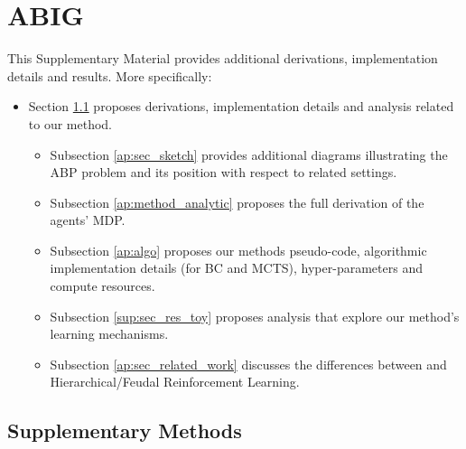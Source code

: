 
\chapter{ABIG}
This Supplementary Material provides additional derivations, implementation details and results. More specifically: 
\begin{itemize}[noitemsep]

    \item Section \ref{ap:method} proposes derivations, implementation details and analysis related to our method.
    \begin{itemize}[noitemsep]
        \item Subsection \ref{ap:sec_sketch} provides additional diagrams illustrating the ABP problem and its position with respect to related settings.
        \item Subsection \ref{ap:method_analytic} proposes the full derivation of the agents' MDP.
        \item Subsection \ref{ap:algo} proposes our methods pseudo-code, algorithmic implementation details (for BC and MCTS), hyper-parameters and compute resources.
        \item Subsection \ref{sup:sec_res_toy} proposes analysis that explore our method's learning mechanisms.
        \item Subsection \ref{ap:sec_related_work} discusses the differences between \abp and Hierarchical/Feudal Reinforcement Learning.
    \end{itemize}
\end{itemize}


\section{Supplementary Methods}
\label{ap:method}

